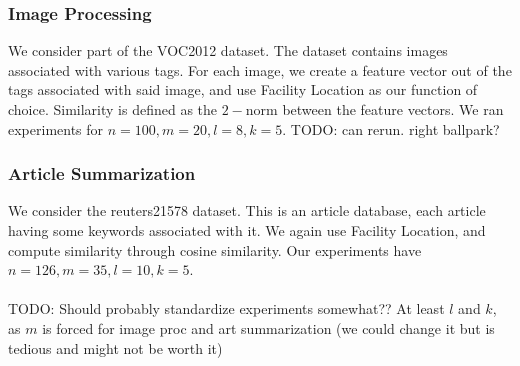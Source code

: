 \subsubsection{Image Processing}

We consider part of the VOC2012 dataset. The dataset contains images associated with various tags. For each image, we create a feature vector out of the tags associated with said image, and use Facility Location as our function of choice. Similarity is defined as the $2-$norm between the feature vectors. We ran experiments for $n = 100, m = 20, l = 8, k = 5$. TODO: can rerun. right ballpark?

\subsubsection{Article Summarization}

We consider the reuters21578 dataset. This is an article database, each article having some keywords associated with it. We again use Facility Location, and compute similarity through cosine similarity. Our experiments have $n = 126, m = 35, l = 10, k = 5$. \\
\\
TODO: Should probably standardize experiments somewhat?? At least $l$ and $k$, as $m$ is forced for image proc and art summarization (we could change it but is tedious and might not be worth it)

